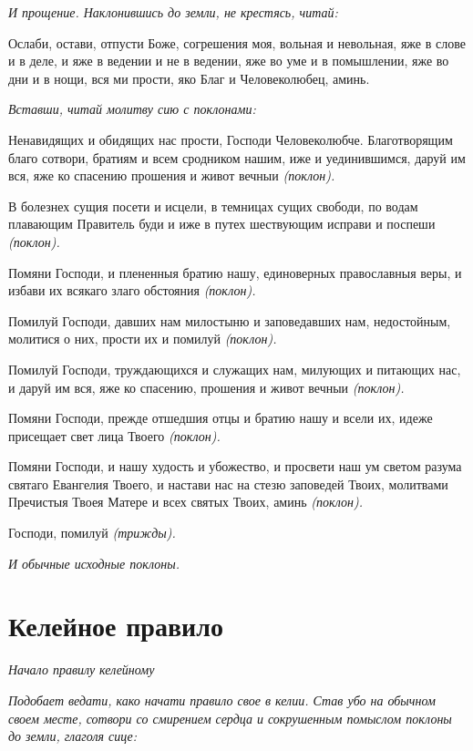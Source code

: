  \itshape И прощение. Наклонившись до земли, не крестясь, читай:\normalfont{}


   Ослаби, остави, отпусти Боже, согрешения моя, вольная и невольная,
яже в слове и в деле, и яже в ведении и не в ведении, яже во уме
и в помышлении, яже во дни и в нощи, вся ми прости, яко Благ и
Человеколюбец, аминь.


 \itshape Вставши, читай молитву сию с поклонами:\normalfont{}


   Ненавидящих и обидящих нас прости, Господи Человеколюбче.
Благотворящим благо сотвори, братиям и всем сродником нашим, иже и
уединившимся, даруй им вся, яже ко спасению прошения и живот вечныи
\itshape (поклон)\normalfont{}.


   В болезнех сущия посети и исцели, в темницах сущих свободи, по водам
плавающим Правитель буди и иже в путех шествующим исправи и поспеши
\itshape (поклон)\normalfont{}.


   Помяни Господи, и плененныя братию нашу, единоверных православныя
веры, и избави их всякаго злаго обстояния \itshape (поклон)\normalfont{}.


   Помилуй Господи, давших нам милостыню и заповедавших нам,
недостойным, молитися о них, прости их и помилуй \itshape (поклон)\normalfont{}.


   Помилуй Господи, труждающихся и служащих нам, милующих и
питающих нас, и даруй им вся, яже ко спасению, прошения и живот вечныи
\itshape (поклон)\normalfont{}.


   Помяни Господи, прежде отшедшия отцы и братию нашу и всели их,
идеже присещает свет лица Твоего \itshape (поклон)\normalfont{}.


   Помяни Господи, и нашу худость и убожество, и просвети наш ум светом
разума святаго Евангелия Твоего, и настави нас на стезю заповедей Твоих,
молитвами Пречистыя Твоея Матере и всех святых Твоих, аминь
\itshape (поклон)\normalfont{}.


   Господи, помилуй \itshape (трижды)\normalfont{}.


 \itshape И обычные исходные поклоны.\normalfont{}



\section{Келейное правило}



\itshape Начало правилу келейному\normalfont{}


 \itshape Подобает ведати, како начати правило свое в келии. Став убо на обычном
своем месте, сотвори со смирением сердца и сокрушенным помыслом
поклоны до земли, глаголя сице:\normalfont{}



